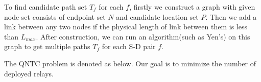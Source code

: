 To find candidate path set $T_f$ for each $f$, firstly we construct a graph with given node set consists of endpoint set $N$ and candidate location set $P$. Then we add a link between any two nodes if the physical length of link between them is less than $L_{max}$. After construction, we can run an algorithm(such as Yen's\cite{Multipaths}) on this graph to get multiple paths $T_f$ for each S-D pair $f$.

The QNTC problem is denoted as below. Our goal is to minimize the number of deployed relays.

%
%

